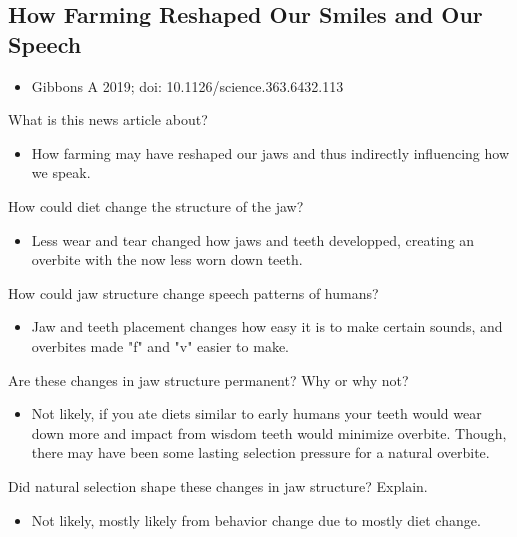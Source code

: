 \documentclass[12pt,a4paper]{article}
\begin{document}
\subsection{How Farming Reshaped Our Smiles and Our Speech}
\begin{itemize}
    \item Gibbons A 2019; doi: 10.1126/science.363.6432.113
\end{itemize}
\begin{enumerate}
    {\color{darklc}\item What is this news article about?}
        \begin{itemize}
            \item How farming may have reshaped our jaws and thus indirectly influencing how we speak.
        \end{itemize}
    {\color{darklc}\item How could diet change the structure of the jaw?}
        \begin{itemize}
            \item Less wear and tear changed how jaws and teeth developped, creating an overbite with the now less worn down teeth.
        \end{itemize}
    {\color{darklc}\item How could jaw structure change speech patterns of humans?}
        \begin{itemize}
            \item Jaw and teeth placement changes how easy it is to make certain sounds, and overbites made "f" and "v" easier to make.
        \end{itemize}
    {\color{darklc}\item Are these changes in jaw structure permanent? Why or why not?}
        \begin{itemize}
            \item Not likely, if you ate diets similar to early humans your teeth would wear down more and impact from wisdom teeth would minimize overbite. Though, there may have been some lasting selection pressure for a natural overbite.
        \end{itemize}
    {\color{darklc}\item Did natural selection shape these changes in jaw structure? Explain.}
        \begin{itemize}
            \item Not likely, mostly likely from behavior change due to mostly diet change.
        \end{itemize}

\end{enumerate}
\end{document}
